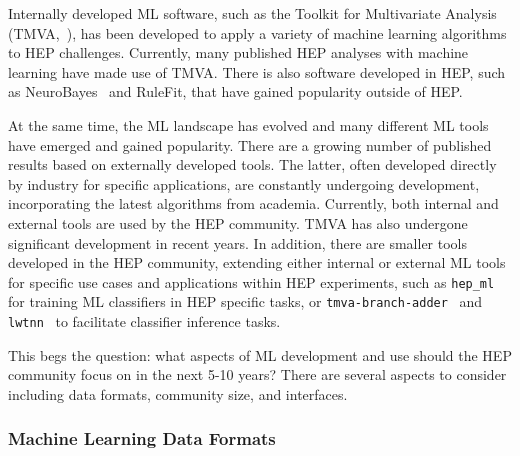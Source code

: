 Internally developed ML software, such as the Toolkit for Multivariate Analysis (TMVA,~\cite{TMVA}), has been developed to apply a variety of machine learning algorithms to HEP challenges. Currently, many published HEP analyses with machine learning have made use of TMVA. There is also software developed in HEP, such as NeuroBayes~\cite{neurobayes,neurobayes2} and RuleFit, that have gained popularity outside of HEP.

At the same time, the ML landscape has evolved and many different ML tools have emerged and gained popularity. There are a growing number of published results based on externally developed tools. The latter, often developed directly by industry for specific applications, are constantly undergoing development, incorporating the latest algorithms from academia. Currently, both internal and external tools are used by the HEP community. TMVA has also undergone significant development in recent years.
In addition, there are smaller tools developed in the HEP community, extending either internal or external ML tools for specific use cases and applications within HEP experiments, such as \texttt{hep\_ml}~\cite{hep_ml} for training ML classifiers in HEP specific tasks, or \texttt{tmva-branch-adder}~\cite{tmva-branch-adder} and \texttt{lwtnn}~\cite{lwtnn} to facilitate classifier inference tasks.

This begs the question: what aspects of ML development and use should the HEP community focus on in the next 5-10 years? There are several aspects to consider including data formats, community size, and interfaces.

\subsubsection{Machine Learning Data Formats}\label{sec:data_formats}

